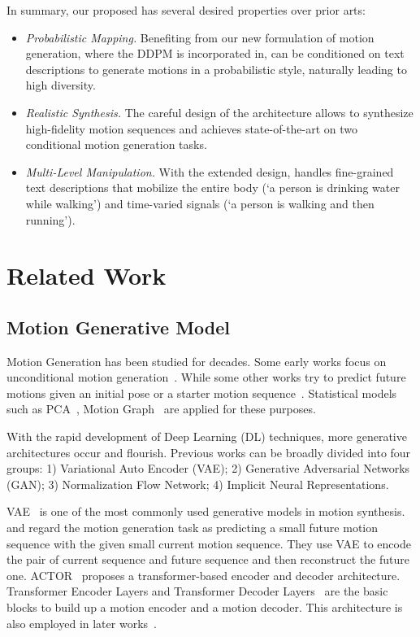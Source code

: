 In summary, our proposed \name has several desired properties over prior arts: 

\begin{itemize}
    \item \emph{Probabilistic Mapping.} Benefiting from our new formulation of motion generation, where the DDPM is incorporated in, \name can be conditioned on text descriptions to generate motions in a probabilistic style, naturally leading to high diversity.
    \item \emph{Realistic Synthesis.} The careful design of the architecture allows \name to synthesize high-fidelity motion sequences and achieves state-of-the-art on two conditional motion generation tasks. 
    \item \emph{Multi-Level Manipulation.} With the extended design, \name handles fine-grained text descriptions that mobilize the entire body (\eg `a person is drinking water while walking') and time-varied signals (\eg `a person is walking and then running').
\end{itemize}

\section{Related Work}\label{sec2}

\subsection{Motion Generative Model}\label{sec2_1}
Motion Generation has been studied for decades. Some early works focus on unconditional motion generation~\citep{rose1998verbs,ikemoto2009generalizing,mukai2005geostatistical}. While some other works try to predict future motions given an initial pose or a starter motion sequence~\citep{futrelle1978extraction,gavrila1999visual,o1980model}. Statistical models such as PCA~\citep{ormoneit2005representing}, Motion Graph~\citep{min2012motion} are applied for these purposes. 

With the rapid development of Deep Learning (DL) techniques, more generative architectures occur and flourish. Previous works can be broadly divided into four groups: 1) Variational Auto Encoder (VAE); 2) Generative Adversarial Networks (GAN); 3) Normalization Flow Network; 4) Implicit Neural Representations.

VAE~\citep{kingma2013auto} is one of the most commonly used generative models in motion synthesis. \cite{yan2018mt} and \cite{aliakbarian2020stochastic} regard the motion generation task as predicting a small future motion sequence with the given small current motion sequence. They use VAE to encode the pair of current sequence and future sequence and then reconstruct the future one. ACTOR~\citep{petrovich2021action} proposes a transformer-based encoder and decoder architecture. Transformer Encoder Layers and Transformer Decoder Layers~\citep{vaswani2017attention} are the basic blocks to build up a motion encoder and a motion decoder. This architecture is also employed in later works~\citep{tevet2022motionclip,hong2022avatarclip,petrovich2022temos}. 

